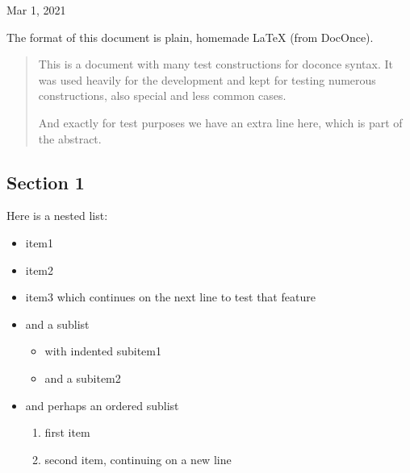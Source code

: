 \documentclass[%
oneside,                 %
final,                   %
10pt]{article}
\theoremstyle{definition}
\begin{document}

\begin{center}
Mar 1, 2021
\end{center}

\vspace{1cm}


\tableofcontents

\vspace{1cm} %


The format of this document is
plain, homemade {\LaTeX} (from DocOnce).


\begin{abstract}
This is a document with many test constructions for doconce syntax.
It was used heavily for the development and kept for testing
numerous constructions, also special and less common cases.

And exactly for test purposes we have an extra line here, which
is part of the abstract.

\end{abstract}

\subsection{Section 1}
\label{sec1}

Here is a nested list:

\begin{itemize}
  \item item1

  \item item2

  \item item3 which continues
    on the next line to test that feature

  \item and a sublist
\begin{itemize}

    \item with indented subitem1

    \item and a subitem2

\end{itemize}

\noindent
  \item and perhaps an ordered sublist
\begin{enumerate}

   \item first item

   \item second item,
      continuing on a new line
\end{enumerate}

\noindent
\end{itemize}
\end{document}
